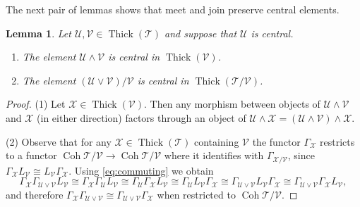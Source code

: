 \documentclass{amsart}[a4]
\newtheorem{lemma}[theorem]{Lemma}
\theoremstyle{definition}
\theoremstyle{remark}
\numberwithin{equation}{section}
\newcommand{\Coh}{\operatorname{Coh}}
\newcommand{\Thick}{\operatorname{Thick}}
\newcommand{\cat}{\mathcal}
\let\Gamma\varGamma
\begin{document}
The next pair of lemmas shows that meet and join preserve central
elements.

\begin{lemma}\label{le:central-res}
  Let $\cat U,\cat V\in\Thick(\cat T)$ and suppose that $\cat U$ is central.
  \begin{enumerate}
  \item The element $\cat U\wedge\cat V$ is central in $\Thick(\cat V)$. 
  \item The element $(\cat U\vee\cat V)/\cat V$ is central in $\Thick(\cat T/\cat V)$.
\end{enumerate}
\end{lemma}
\begin{proof}
  (1) Let $\cat X\in\Thick(\cat V)$. Then any morphism between objects of $\cat U\wedge\cat V$
  and $\cat X$ (in either direction) factors through an object of
  $\cat U\wedge\cat X=(\cat U\wedge\cat V)\wedge\cat X$. 

  (2) Observe that for any $\cat X\in\Thick(\cat T)$ containing
  $\cat V$ the functor $\Gamma_\cat X$ restricts to a functor
  $\Coh\cat T/\cat V\to\Coh\cat T/\cat V$ where it identifies with
  $\Gamma_{\cat X/\cat V}$, since
  $\Gamma_\cat X L_\cat V\cong L_\cat V\Gamma_\cat X$.  Using
  \eqref{eq:commuting} we obtain
  \[\Gamma_\cat X\Gamma_{\cat U\vee\cat V} L_\cat V\cong \Gamma_\cat X \Gamma_{\cat U} L_\cat V\cong
    \Gamma_\cat U\Gamma_\cat X L_\cat V\cong \Gamma_\cat U L_\cat V \Gamma_\cat X \cong \Gamma_{\cat U\vee\cat V}
    L_\cat V \Gamma_\cat X \cong \Gamma_{\cat U\vee\cat V} \Gamma_\cat X L_\cat V,\] and therefore
  $\Gamma_\cat X \Gamma_{\cat U\vee\cat V}\cong \Gamma_{\cat U\vee\cat V}\Gamma_\cat X$ when restricted to
  $\Coh\cat T/\cat V$.
\end{proof}  
\end{document}
